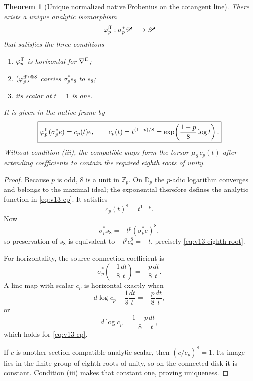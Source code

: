 \documentclass[11pt]{article}
\newtheorem{theorem}{Theorem}[section]
\theoremstyle{definition}
\theoremstyle{remark}
\begin{document}
\begin{theorem}[Unique normalized native Frobenius on the cotangent line]
\label{thm:v13-native-frobenius}
There exists a unique analytic isomorphism
\begin{equation}
 \varphi_p^{\rm ff}:\sigma_p^*\mathscr P\longrightarrow\mathscr P
 \label{eq:v13-line-frob-map}
\end{equation}
that satisfies the three conditions
\begin{enumerate}[label=(\roman*)]
\item $\varphi_p^{\rm ff}$ is horizontal for $\nabla^{\rm ff}$;
\item $(\varphi_p^{\rm ff})^{\otimes8}$ carries $\sigma_p^*s_8$ to $s_8$;
\item its scalar at $t=1$ is one.
\end{enumerate}
It is given in the native frame by
\begin{equation}
 \boxed{
 \varphi_p^{\rm ff}(\sigma_p^*e)
 =c_p(t)e,
 \qquad
 c_p(t)=t^{(1-p)/8}
 =\exp\!\left(\frac{1-p}{8}\log t\right).
 }
 \label{eq:v13-cp}
\end{equation}
Without condition (iii), the compatible maps form the torsor
$\mu_8\,c_p(t)$ after extending coefficients to contain the required eighth
roots of unity.
\end{theorem}

\begin{proof}
Because $p$ is odd, $8$ is a unit in $\mathbb Z_p$.  On $\mathbb D_p$ the
$p$-adic logarithm converges and belongs to the maximal ideal; the exponential
therefore defines the analytic function in \cref{eq:v13-cp}.  It satisfies
\begin{equation}
 c_p(t)^8=t^{1-p}.
 \label{eq:v13-eighth-root}
\end{equation}
Now
\[
 \sigma_p^*s_8=-t^p(\sigma_p^*e)^8,
\]
so preservation of $s_8$ is equivalent to
$-t^pc_p^8=-t$, precisely \cref{eq:v13-eighth-root}.

For horizontality, the source connection coefficient is
\[
 \sigma_p^*\!\left(-\frac18\frac{dt}{t}\right)
 =-\frac p8\frac{dt}{t}.
\]
A line map with scalar $c_p$ is horizontal exactly when
\[
 d\log c_p-\frac18\frac{dt}{t}
 =-\frac p8\frac{dt}{t},
\]
or
\[
 d\log c_p=\frac{1-p}{8}\frac{dt}{t},
\]
which holds for \cref{eq:v13-cp}.

If $c$ is another section-compatible analytic scalar, then
$(c/c_p)^8=1$.  Its image lies in the finite group of eighth roots of unity,
so on the connected disk it is constant.  Condition (iii) makes that constant
one, proving uniqueness.
\end{proof}
\end{document}
